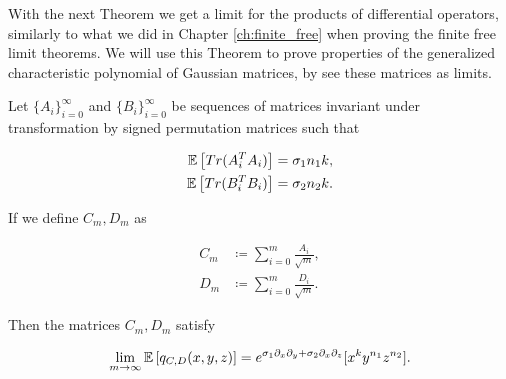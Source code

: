     With the next Theorem we get a limit for the products of differential operators, similarly to what we did in Chapter \ref{ch:finite_free} when proving the finite free limit theorems. We will use this Theorem to prove properties of the generalized characteristic polynomial of Gaussian matrices, by see these matrices as limits.

    \begin{theorem} \label{thm:exp_operator}
        Let $\{A_i\}_{i=0}^\infty$ and $\{B_i\}_{i=0}^\infty$ be sequences of matrices invariant under transformation by signed permutation matrices such that

        \begin{align*}
            \mathbb E \left[ Tr(A^T_iA_i) \right] &= \sigma_1 n_1 k,\\
            \mathbb E \left[ Tr(B^T_iB_i) \right] &= \sigma_2 n_2 k.
        \end{align*}

        If we define $C_m, D_m$ as

        \begin{align*}
            C_m &\coloneqq \sum_{i=0}^m \frac{A_i}{\sqrt m}, \\
            D_m &\coloneqq \sum_{i=0}^m \frac{D_i}{\sqrt m}.
        \end{align*}

        Then the matrices $C_m, D_m$ satisfy

        \begin{equation*}
            \lim_{m\to\infty} \mathbb E \left[ q_{C,D}(x,y,z) \right] = e^{\sigma_1 \partial_x \partial_y + \sigma_2 \partial_x \partial_z}[x^k y^{n_1} z^{n_2}].
        \end{equation*}
    \end{theorem}

